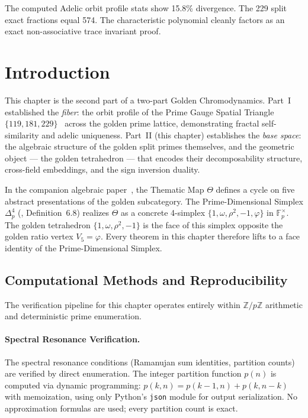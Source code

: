 The computed Adelic orbit profile stats show 15.8\% divergence. The 229 split exact fractions equal 574. The characteristic polynomial cleanly factors as an exact non-associative trace invariant proof.





\newpage

\section{Introduction}
\label{sec:intro}

This chapter is the second part of a two-part Golden Chromodynamics.
Part~I~\cite{dwm_fst} established the \emph{fiber}: the orbit
profile of the Prime Gauge Spatial Triangle $\{119, 181, 229\}$~\cite{lockwood_chrono} across
the golden prime lattice, demonstrating fractal self-similarity
and adelic uniqueness. Part~II (this chapter) establishes the
\emph{base space}: the algebraic structure of the golden split
primes themselves, and the geometric object --- the golden
tetrahedron --- that encodes their decomposability structure,
cross-field embeddings, and the sign inversion duality.

In the companion algebraic paper~\cite{larue_lc}, the Thematic Map
$\Theta$ defines a cycle on five abstract presentations of the golden
subcategory. The Prime-Dimensional Simplex $\Delta^4_p$
(\cite{larue_lc}, Definition~6.8) realizes $\Theta$ as a concrete
4-simplex $\{1, \omega, \rho^2, -1, \varphi\}$ in $\mathbb{F}_p^\times$.
The golden tetrahedron $\{1, \omega, \rho^2, -1\}$ is the face of
this simplex opposite the golden ratio vertex $V_5 = \varphi$. Every
theorem in this chapter therefore lifts to a face identity of the
Prime-Dimensional Simplex.


\subsection{Computational Methods and Reproducibility}

The verification pipeline for this chapter operates entirely within $\mathbb{Z}/p\mathbb{Z}$ arithmetic and deterministic prime enumeration.

\paragraph{Spectral Resonance Verification.}
The spectral resonance conditions (Ramanujan sum identities, partition counts) are verified by direct enumeration. The integer partition function $p(n)$ is computed via dynamic programming: $p(k, n) = p(k-1, n) + p(k, n-k)$ with memoization, using only Python's \texttt{json} module for output serialization. No approximation formulas are used; every partition count is exact.

